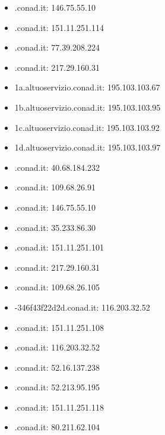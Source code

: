 \documentclass{article}
\begin{document}
\begin{itemize}
        \item \textbfpim.conad.it: 146.75.55.10
    
        \item \textbfportale.conad.it: 151.11.251.114
    
        \item \textbfpremiateelambiente.conad.it: 77.39.208.224
    
        \item \textbfprodotti.conad.it: 217.29.160.31
    
        \item \textbfs1a.altuoservizio.conad.it: 195.103.103.67
    
        \item \textbfs1b.altuoservizio.conad.it: 195.103.103.95
    
        \item \textbfs1c.altuoservizio.conad.it: 195.103.103.92
    
        \item \textbfs1d.altuoservizio.conad.it: 195.103.103.97
    
        \item \textbfscontatievincenti.conad.it: 40.68.184.232
    
        \item \textbfservice.conad.it: 109.68.26.91
    
        \item \textbfspesaonline.conad.it: 146.75.55.10
    
        \item \textbfsport.conad.it: 35.233.86.30
    
        \item \textbfsslvpn.conad.it: 151.11.251.101
    
        \item \textbfsupermercati.conad.it: 217.29.160.31
    
        \item \textbftms.conad.it: 109.68.26.105
    
        \item \textbftravel-346f43f22d2d.conad.it: 116.203.32.52
    
        \item \textbftsgateway.conad.it: 151.11.251.108
    
        \item \textbfviaggi.conad.it: 116.203.32.52
    
        \item \textbfvincinatale.conad.it: 52.16.137.238
    
        \item \textbfvolantini.conad.it: 52.213.95.195
    
        \item \textbfwebapps.conad.it: 151.11.251.118
    
        \item \textbfwebkit.conad.it: 80.211.62.104
    
\end{itemize}
\end{document}
